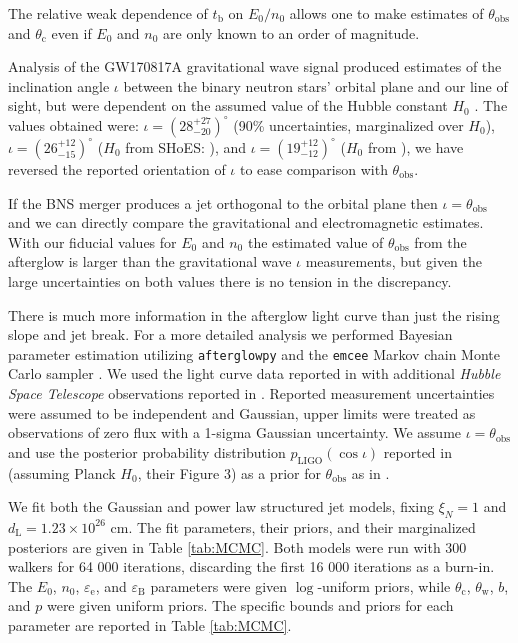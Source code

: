 \documentclass[twocolumn]{aastex62}
\newcommand{\gwbns}{GW170817A}
\newcommand{\afterglowpy}{{\tt afterglowpy}}
\newcommand{\emcee}{{\tt emcee}}
\newcommand{\hubble}{{\em Hubble Space Telescope}}
\newcommand{\tb}{\ensuremath{t_{\mathrm{b}}}}
\newcommand{\thobs}{\ensuremath{\theta_{\mathrm{obs}}}}
\newcommand{\thW}{\ensuremath{\theta_{\mathrm{w}}}}
\newcommand{\thC}{\ensuremath{\theta_{\mathrm{c}}}}
\newcommand{\epse}{\ensuremath{\varepsilon_{\mathrm{e}}}}
\newcommand{\epsB}{\ensuremath{\varepsilon_{\mathrm{B}}}}
\newcommand{\dL}{\ensuremath{d_{\mathrm{L}}}}
\begin{document}
The relative weak dependence of $\tb$ on $E_0/n_0$ allows one to make estimates of $\thobs$ and $\thC$ even if $E_0$ and $n_0$ are only known to an order of magnitude. 

 Analysis of the \gwbns{} gravitational wave signal produced estimates of the inclination angle $\iota$ between the binary neutron stars' orbital plane and our line of sight, but were dependent on the assumed value of the Hubble constant $H_0$ \citep{Abbott:2017aa}.  The values obtained were:
 $\iota = \left({28}^{+27}_{-20}\right)^\circ$ (90\% uncertainties, marginalized over $H_0$), $\iota = \left(26^{+12}_{-15}\right)^\circ$ ($H_0$ from SHoES: \citet{Riess:2016aa}), and $\iota = \left(19^{+12}_{-12}\right)^\circ$ ($H_0$ from \citet{Planck-Collaboration:2016aa}), we have reversed the reported orientation of $\iota$ to ease comparison with $\thobs$.
 
If the BNS merger produces a jet orthogonal to the orbital plane then $\iota = \thobs$ and we can directly compare the gravitational and electromagnetic estimates.  With our fiducial values for $E_0$ and $n_0$ the estimated value of $\thobs$ from the afterglow is larger than the gravitational wave $\iota$ measurements, but given the large uncertainties on both values there is no tension in the discrepancy.

There is much more information in the afterglow light curve than just the rising slope and jet break.  For a more detailed analysis we performed Bayesian parameter estimation utilizing \afterglowpy{} and the \emcee{} Markov chain Monte Carlo sampler \citep{Foreman-Mackey:2013aa}.  We used the light curve data reported in \citet{Troja:2019ab} with additional \hubble{} observations reported in \citet{Lamb:2019aa}. Reported measurement uncertainties were assumed to be independent and Gaussian, upper limits were treated as observations of zero flux with a 1-sigma Gaussian uncertainty. We assume $\iota = \thobs$ and use the posterior probability distribution $p_{\mathrm{LIGO}}(\cos \iota)$ reported in \citet{Abbott:2017aa} (assuming Planck $H_0$, their Figure 3) as a prior for $\thobs$ as in \citet{Troja:2018aa}.

We fit both the Gaussian and power law structured jet models, fixing $\xi_N = 1$ and $\dL = 1.23 \times 10^{26}$ cm.  The fit parameters, their priors, and their marginalized posteriors are given in Table \ref{tab:MCMC}. Both models were run with 300 walkers for 64 000 iterations, discarding the first 16 000 iterations as a burn-in.  The $E_0$, $n_0$, $\epse$, and $\epsB$ parameters were given $\log$-uniform priors, while $\thC$, $\thW$, $b$, and $p$ were given uniform priors.  The specific bounds and priors for each parameter are reported in Table \ref{tab:MCMC}.
\end{document}
